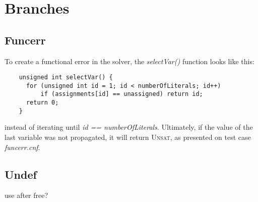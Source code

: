     \section{Branches}
    \subsection{Funcerr}
    To create a functional error in the solver, the \textit{selectVar()} function looks like this:
    \begin{lstlisting}
    unsigned int selectVar() {  
      for (unsigned int id = 1; id < numberOfLiterals; id++) 
          if (assignments[id] == unassigned) return id;
      return 0;
  	}
 	\end{lstlisting}
instead of iterating until \textit{id == numberOfLiterals}. Ultimately, if the value of the last variable was not propagated, it will return \textsc{Unsat}, as presented on test case \textit{funcerr.cnf}.
    \subsection{Undef}
    use after free?
    
    
